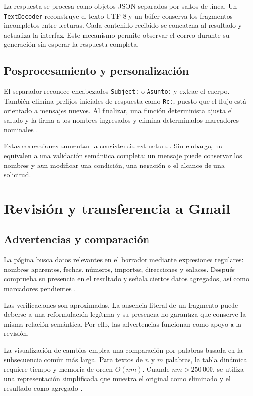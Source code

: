 \documentclass[conference]{IEEEtran}
\begin{document}
La respuesta se procesa como objetos JSON separados por saltos de línea. Un \texttt{TextDecoder} reconstruye el texto UTF-8 y un búfer conserva los fragmentos incompletos entre lecturas. Cada contenido recibido se concatena al resultado y actualiza la interfaz. Este mecanismo permite observar el correo durante su generación sin esperar la respuesta completa.

\subsection{Posprocesamiento y personalización}
El separador reconoce encabezados \texttt{Subject:} o \texttt{Asunto:} y extrae el cuerpo. También elimina prefijos iniciales de respuesta como \texttt{Re:}, puesto que el flujo está orientado a mensajes nuevos. Al finalizar, una función determinista ajusta el saludo y la firma a los nombres ingresados y elimina determinados marcadores nominales \cite{email}.

Estas correcciones aumentan la consistencia estructural. Sin embargo, no equivalen a una validación semántica completa: un mensaje puede conservar los nombres y aun modificar una condición, una negación o el alcance de una solicitud.

\section{Revisión y transferencia a Gmail}
\subsection{Advertencias y comparación}
La página busca datos relevantes en el borrador mediante expresiones regulares: nombres aparentes, fechas, números, importes, direcciones y enlaces. Después comprueba su presencia en el resultado y señala ciertos datos agregados, así como marcadores pendientes \cite{email}.

Las verificaciones son aproximadas. La ausencia literal de un fragmento puede deberse a una reformulación legítima y su presencia no garantiza que conserve la misma relación semántica. Por ello, las advertencias funcionan como apoyo a la revisión.

La visualización de cambios emplea una comparación por palabras basada en la subsecuencia común más larga. Para textos de $n$ y $m$ palabras, la tabla dinámica requiere tiempo y memoria de orden $O(nm)$. Cuando $nm>250\,000$, se utiliza una representación simplificada que muestra el original como eliminado y el resultado como agregado \cite{email}.
\end{document}
